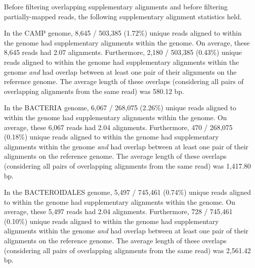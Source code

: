 Before filtering overlapping supplementary alignments and before filtering
partially-mapped reads, the following supplementary alignment statistics held.

In the CAMP genome, 8,645 / 503,385 (1.72\%) unique reads aligned to within the genome had supplementary alignments within the genome.
On average, these 8,645 reads had 2.07 alignments.
Furthermore, 2,180 / 503,385 (0.43\%) unique reads aligned to within the genome had supplementary alignments within the genome \emph{and} had overlap between at least one pair of their alignments on the reference genome.
The average length of these overlaps (considering all pairs of overlapping alignments from the same read) was 580.12 bp.

In the BACTERIA genome, 6,067 / 268,075 (2.26\%) unique reads aligned to within the genome had supplementary alignments within the genome.
On average, these 6,067 reads had 2.04 alignments.
Furthermore, 470 / 268,075 (0.18\%) unique reads aligned to within the genome had supplementary alignments within the genome \emph{and} had overlap between at least one pair of their alignments on the reference genome.
The average length of these overlaps (considering all pairs of overlapping alignments from the same read) was 1,417.80 bp.

In the BACTEROIDALES genome, 5,497 / 745,461 (0.74\%) unique reads aligned to within the genome had supplementary alignments within the genome.
On average, these 5,497 reads had 2.04 alignments.
Furthermore, 728 / 745,461 (0.10\%) unique reads aligned to within the genome had supplementary alignments within the genome \emph{and} had overlap between at least one pair of their alignments on the reference genome.
The average length of these overlaps (considering all pairs of overlapping alignments from the same read) was 2,561.42 bp.
\endinput